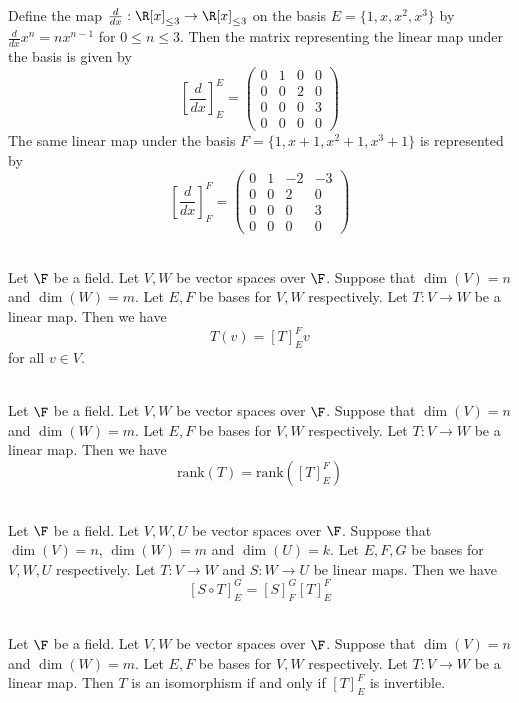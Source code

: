 \documentclass[a4paper]{article}
\begin{document}
\begin{eg}{}{}\\
Define the map $\frac{d}{dx}:\R[x]_{\leq 3}\to\R[x]_{\leq 3}$ on the basis $E=\{1,x,x^2,x^3\}$ by $\frac{d}{dx}x^n=nx^{n-1}$ for $0\leq n\leq 3$. Then the matrix representing the linear map under the basis is given by $$\left[\frac{d}{dx}\right]_E^E=\begin{pmatrix}
0 & 1 & 0 & 0\\
0 & 0 & 2 & 0\\
0 & 0 & 0 & 3\\
0 & 0 & 0 & 0
\end{pmatrix}$$ The same linear map under the basis $F=\{1,x+1,x^2+1,x^3+1\}$ is represented by $$\left[\frac{d}{dx}\right]_F^F=\begin{pmatrix}
0 & 1 & -2 & -3\\
0 & 0 & 2 & 0\\
0 & 0 & 0 & 3\\
0 & 0 & 0 & 0
\end{pmatrix}$$
\end{eg}

\begin{lmm}{}{}\\
Let $\F$ be a field. Let $V,W$ be vector spaces over $\F$. Suppose that $\dim(V)=n$ and $\dim(W)=m$. Let $E,F$ be bases for $V,W$ respectively. Let $T:V\to W$ be a linear map. Then we have $$T(v)=[T]_E^Fv$$ for all $v\in V$. 
\end{lmm}

\begin{prp}{}{}\\
Let $\F$ be a field. Let $V,W$ be vector spaces over $\F$. Suppose that $\dim(V)=n$ and $\dim(W)=m$. Let $E,F$ be bases for $V,W$ respectively. Let $T:V\to W$ be a linear map. Then we have $$\text{rank}(T)=\text{rank}([T]_E^F)$$
\end{prp}

\begin{prp}{}{}\\
Let $\F$ be a field. Let $V,W,U$ be vector spaces over $\F$. Suppose that $\dim(V)=n$, $\dim(W)=m$ and $\dim(U)=k$. Let $E,F,G$ be bases for $V,W,U$ respectively. Let $T:V\to W$ and $S:W\to U$ be linear maps. Then we have $$[S\circ T]_E^G=[S]_F^G[T]_E^F$$
\end{prp}

\begin{prp}{}{}\\
Let $\F$ be a field. Let $V,W$ be vector spaces over $\F$. Suppose that $\dim(V)=n$ and $\dim(W)=m$. Let $E,F$ be bases for $V,W$ respectively. Let $T:V\to W$ be a linear map. Then $T$ is an isomorphism if and only if $[T]_E^F$ is invertible. 
\end{prp}
\end{document}
